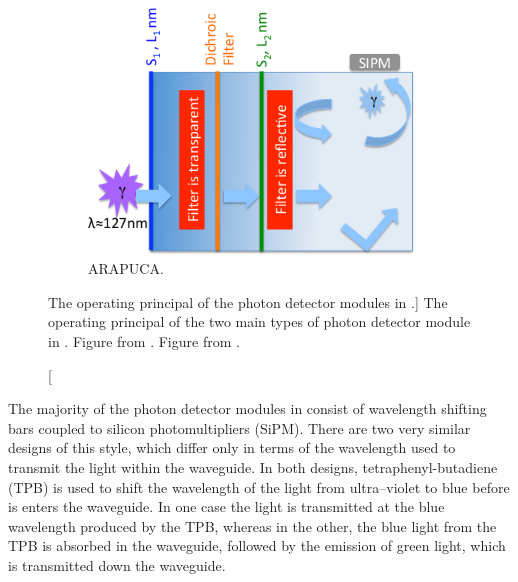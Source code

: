 \begin{figure}
\begin{subfigure}[b]{0.69\textwidth}
		\includegraphics[width=0.95\textwidth]{figures/pdsp_arapuca.png}
		\caption{ARAPUCA.}
		\label{fig:arapuca}
	\end{subfigure}

	\caption
	[The operating principal of the photon detector modules in \protodune{}.]
	{The operating principal of the two main types of photon detector module in 
	\protodune{}. Figure  from \cite{Abi:2017aow}. Figure 
	 from \cite{Machado:2016jqe}.}

	\label{fig:pdsp_pd}

\end{figure}

The majority of the photon detector modules in \protodune{} consist of 
wavelength shifting bars coupled to silicon photomultipliers (SiPM). There are 
two very similar designs of this style, which differ only in terms of the 
wavelength used to transmit the light within the waveguide. In both designs, 
tetraphenyl-butadiene (TPB) is used to shift the wavelength of the light from 
ultra--violet to blue before is enters the waveguide. In one case the 
light is transmitted at the blue wavelength produced by the TPB, whereas 
in the other, the blue light from the TPB is absorbed in the waveguide, followed
by the emission of green light, which is transmitted down the waveguide.

